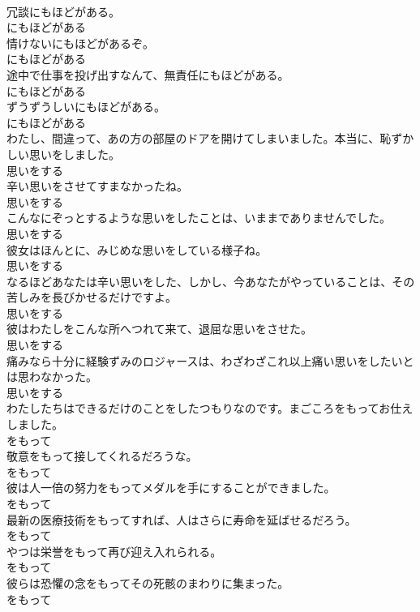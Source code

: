 \documentclass[8pt]{extreport}
\begin{document}
\begin{CJK}{UTF8}{min}
\\	冗談にもほどがある。	
\\	にもほどがある
\\	情けないにもほどがあるぞ。	
\\	にもほどがある
\\	途中で仕事を投げ出すなんて、無責任にもほどがある。	
\\	にもほどがある
\\	ずうずうしいにもほどがある。	
\\	にもほどがある
\\	わたし、間違って、あの方の部屋のドアを開けてしまいました。本当に、恥ずかしい思いをしました。	
\\	思いをする
\\	辛い思いをさせてすまなかったね。	
\\	思いをする
\\	こんなにぞっとするような思いをしたことは、いままでありませんでした。	
\\	思いをする
\\	彼女はほんとに、みじめな思いをしている様子ね。	
\\	思いをする
\\	なるほどあなたは辛い思いをした、しかし、今あなたがやっていることは、その苦しみを長びかせるだけですよ。	
\\	思いをする
\\	彼はわたしをこんな所へつれて来て、退屈な思いをさせた。	
\\	思いをする
\\	痛みなら十分に経験ずみのロジャースは、わざわざこれ以上痛い思いをしたいとは思わなかった。	
\\	思いをする
\\	わたしたちはできるだけのことをしたつもりなのです。まごころをもってお仕えしました。	
\\	をもって
\\	敬意をもって接してくれるだろうな。	
\\	をもって
\\	彼は人一倍の努力をもってメダルを手にすることができました。	
\\	をもって
\\	最新の医療技術をもってすれば、人はさらに寿命を延ばせるだろう。	
\\	をもって
\\	やつは栄誉をもって再び迎え入れられる。	
\\	をもって
\\	彼らは恐懼の念をもってその死骸のまわりに集まった。	
\\	をもって

\end{CJK}
\end{document}
